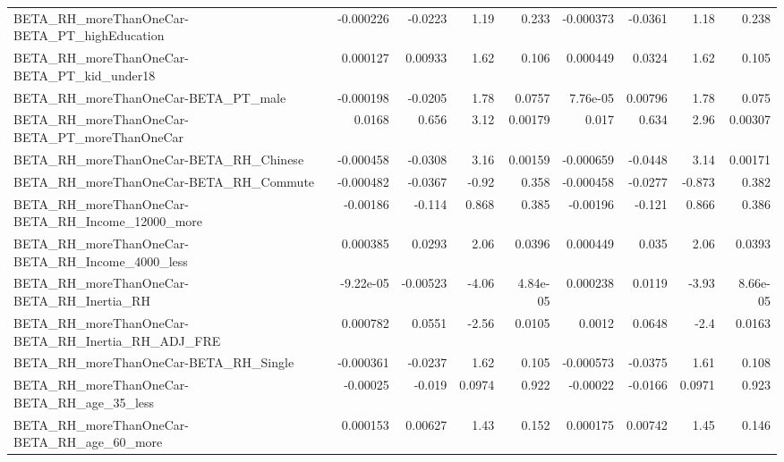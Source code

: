 \begin{tabular}{lrrrrrrrr}
BETA\_RH\_moreThanOneCar-BETA\_PT\_highEducation       &   -0.000226 &      -0.0223 &     1.19 &    0.233 &  -0.000373 &     -0.0361 &         1.18 &         0.238 \\
BETA\_RH\_moreThanOneCar-BETA\_PT\_kid\_under18         &    0.000127 &      0.00933 &     1.62 &    0.106 &   0.000449 &      0.0324 &         1.62 &         0.105 \\
BETA\_RH\_moreThanOneCar-BETA\_PT\_male                &   -0.000198 &      -0.0205 &     1.78 &   0.0757 &   7.76e-05 &     0.00796 &         1.78 &         0.075 \\
BETA\_RH\_moreThanOneCar-BETA\_PT\_moreThanOneCar      &      0.0168 &        0.656 &     3.12 &  0.00179 &      0.017 &       0.634 &         2.96 &       0.00307 \\
BETA\_RH\_moreThanOneCar-BETA\_RH\_Chinese             &   -0.000458 &      -0.0308 &     3.16 &  0.00159 &  -0.000659 &     -0.0448 &         3.14 &       0.00171 \\
BETA\_RH\_moreThanOneCar-BETA\_RH\_Commute             &   -0.000482 &      -0.0367 &    -0.92 &    0.358 &  -0.000458 &     -0.0277 &       -0.873 &         0.382 \\
BETA\_RH\_moreThanOneCar-BETA\_RH\_Income\_12000\_more   &    -0.00186 &       -0.114 &    0.868 &    0.385 &   -0.00196 &      -0.121 &        0.866 &         0.386 \\
BETA\_RH\_moreThanOneCar-BETA\_RH\_Income\_4000\_less    &    0.000385 &       0.0293 &     2.06 &   0.0396 &   0.000449 &       0.035 &         2.06 &        0.0393 \\
BETA\_RH\_moreThanOneCar-BETA\_RH\_Inertia\_RH          &   -9.22e-05 &     -0.00523 &    -4.06 & 4.84e-05 &   0.000238 &      0.0119 &        -3.93 &      8.66e-05 \\
BETA\_RH\_moreThanOneCar-BETA\_RH\_Inertia\_RH\_ADJ\_FRE  &    0.000782 &       0.0551 &    -2.56 &   0.0105 &     0.0012 &      0.0648 &         -2.4 &        0.0163 \\
BETA\_RH\_moreThanOneCar-BETA\_RH\_Single              &   -0.000361 &      -0.0237 &     1.62 &    0.105 &  -0.000573 &     -0.0375 &         1.61 &         0.108 \\
BETA\_RH\_moreThanOneCar-BETA\_RH\_age\_35\_less         &    -0.00025 &       -0.019 &   0.0974 &    0.922 &   -0.00022 &     -0.0166 &       0.0971 &         0.923 \\
BETA\_RH\_moreThanOneCar-BETA\_RH\_age\_60\_more         &    0.000153 &      0.00627 &     1.43 &    0.152 &   0.000175 &     0.00742 &         1.45 &         0.146 \\

\end{tabular}

